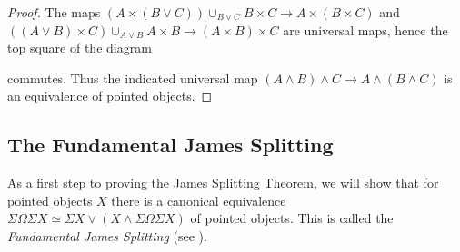 \begin{lemma}
\begin{proof}
        The maps $\left(A\times(B\vee C)\right)\cup_{B\vee C} B\times C\to A\times (B\times C)$ and $\left((A\vee B)\times C\right)\cup_{A\vee B} A\times B\to (A\times B)\times C$ are universal maps, hence the top square of the diagram
        \begin{center}
        \end{center}
        commutes.
        Thus the indicated universal map $(A\wedge B)\wedge C\to A\wedge(B\wedge C)$ is an equivalence of pointed objects.
    \end{proof}
\end{lemma}
\subsection*{The Fundamental James Splitting}
As a first step to proving the James Splitting Theorem, we will show that for pointed objects $X$ there is a canonical equivalence $\Sigma\Omega\Sigma X\simeq\Sigma X\vee\left(X\wedge\Sigma\Omega\Sigma X\right)$ of pointed objects.
This is called the \emph{Fundamental James Splitting} (see \cite[Theorem 2.10]{splittings_21}).

